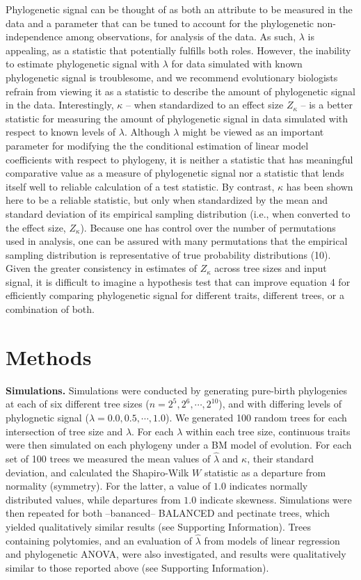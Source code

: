 \documentclass[9pt,twocolumn,twoside,lineno]{pnas-new}
\begin{document}
Phylogenetic signal can be thought of as both an attribute to be
measured in the data and a parameter that can be tuned to account for
the phylogenetic non-independence among observations, for analysis of
the data. As such, \(\lambda\) is appealing, as a statistic that
potentially fulfills both roles. However, the inability to estimate
phylogenetic signal with \(\lambda\) for data simulated with known
phylogenetic signal is troublesome, and we recommend evolutionary
biologists refrain from viewing it as a statistic to describe the amount
of phylogenetic signal in the data. Interestingly, \(\kappa\) -- when
standardized to an effect size \(Z_\kappa\) -- is a better statistic for
measuring the amount of phylogenetic signal in data simulated with
respect to known levels of \(\lambda\). Although \(\lambda\) might be
viewed as an important parameter for modifying the the conditional
estimation of linear model coefficients with respect to phylogeny, it is
neither a statistic that has meaningful comparative value as a measure
of phylogenetic signal nor a statistic that lends itself well to
reliable calculation of a test statistic. By contrast, \(\kappa\) has
been shown here to be a reliable statistic, but only when standardized
by the mean and standard deviation of its empirical sampling
distribution (i.e., when converted to the effect size, \(Z_\kappa\)).
Because one has control over the number of permutations used in
analysis, one can be assured with many permutations that the empirical
sampling distribution is representative of true probability
distributions (10). Given the greater consistency in estimates of
\(Z_\kappa\) across tree sizes and input signal, it is difficult to
imagine a hypothesis test that can improve equation 4 for efficiently
comparing phylogenetic signal for different traits, different trees, or
a combination of both.

\hypertarget{methods}{%
\section{Methods}\label{methods}}

\textbf{Simulations.} Simulations were conducted by generating
pure-birth phylogenies at each of six different tree sizes
(\(n=2^5, 2^6, \cdots, 2^{10}\)), and with differing levels of
phylognetic signal (\(\lambda=0.0, 0.5, \cdots, 1.0\)). We generated 100
random trees for each intersection of tree size and \(\lambda\). For
each \(\lambda\) within each tree size, continuous traits were then
simulated on each phylogeny under a BM model of evolution. For each set
of 100 trees we measured the mean values of \(\hat{\lambda}\) and
\(\kappa\), their standard deviation, and calculated the Shapiro-Wilk
\(W\) statistic as a departure from normality (symmetry). For the
latter, a value of \(1.0\) indicates normally distributed values, while
departures from \(1.0\) indicate skewness. Simulations were then
repeated for both --bananced-- BALANCED and pectinate trees, which
yielded qualitatively similar results (see Supporting Information).
Trees containing polytomies, and an evaluation of \(\hat{\lambda}\) from
models of linear regression and phylogenetic ANOVA, were also
investigated, and results were qualitatively similar to those reported
above (see Supporting Information).
\end{document}
